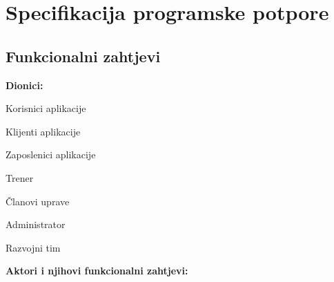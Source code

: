 \chapter{Specifikacija programske potpore}
		
	\section{Funkcionalni zahtjevi}
			
		
			
			
			\noindent \textbf{Dionici:}
			
			\begin{packed_enum}
				
				\item Korisnici aplikacije
				\item Klijenti aplikacije				
				\item Zaposlenici aplikacije
					\begin{packed_enum}
					
					\item Trener
					\item Članovi uprave
					\end{packed_enum}
				\item Administrator
				\item Razvojni tim
				
				
			\end{packed_enum}
			
			\noindent \textbf{Aktori i njihovi funkcionalni zahtjevi:}
			
